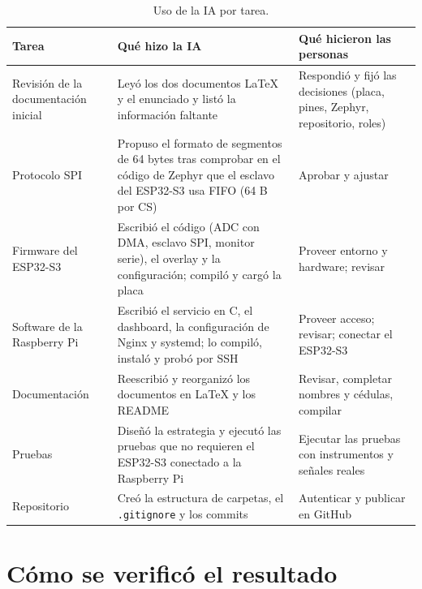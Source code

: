 \documentclass[12pt,a4paper]{article}
\begin{document}
\begin{table}[H]
\centering
\small
\begin{tabular}{@{}p{3.2cm} p{6.4cm} p{5.4cm}@{}}
\toprule
\textbf{Tarea} & \textbf{Qué hizo la IA} & \textbf{Qué hicieron las personas} \\
\midrule
Revisión de la documentación inicial & Leyó los dos documentos \LaTeX{} y el enunciado y listó la información faltante & Respondió y fijó las decisiones (placa, pines, Zephyr, repositorio, roles) \\
Protocolo SPI & Propuso el formato de segmentos de 64 bytes tras comprobar en el código de Zephyr que el esclavo del ESP32-S3 usa FIFO (64 B por CS) & Aprobar y ajustar \\
Firmware del ESP32-S3 & Escribió el código (ADC con DMA, esclavo SPI, monitor serie), el overlay y la configuración; compiló y cargó la placa & Proveer entorno y hardware; revisar \\
Software de la Raspberry Pi & Escribió el servicio en C, el dashboard, la configuración de Nginx y systemd; lo compiló, instaló y probó por SSH & Proveer acceso; revisar; conectar el ESP32-S3 \\
Documentación & Reescribió y reorganizó los documentos en \LaTeX{} y los README & Revisar, completar nombres y cédulas, compilar \\
Pruebas & Diseñó la estrategia y ejecutó las pruebas que no requieren el ESP32-S3 conectado a la Raspberry Pi & Ejecutar las pruebas con instrumentos y señales reales \\
Repositorio & Creó la estructura de carpetas, el \texttt{.gitignore} y los commits & Autenticar y publicar en GitHub \\
\bottomrule
\end{tabular}
\caption{Uso de la IA por tarea.}
\end{table}

\section{Cómo se verificó el resultado}
\end{document}
